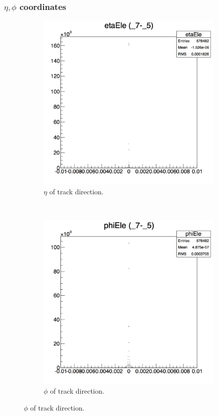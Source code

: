 \documentclass[10pt]{article}
\begin{document}
\subsubsection{$\eta,\phi$ coordinates}
\begin{figure}[h!]
        \centering
        \begin{subfigure}[b]{0.22\textwidth}
                \includegraphics[width=\textwidth]{Plots/eta}
                \caption{$\eta$ of track direction.}
               
        \end{subfigure}%
        ~ %
        \begin{subfigure}[b]{0.22\textwidth}
                \includegraphics[width=\textwidth]{Plots/phi}
                \caption{$\phi$ of track direction.}
            

\end{subfigure}
\end{figure}
\end{document}
